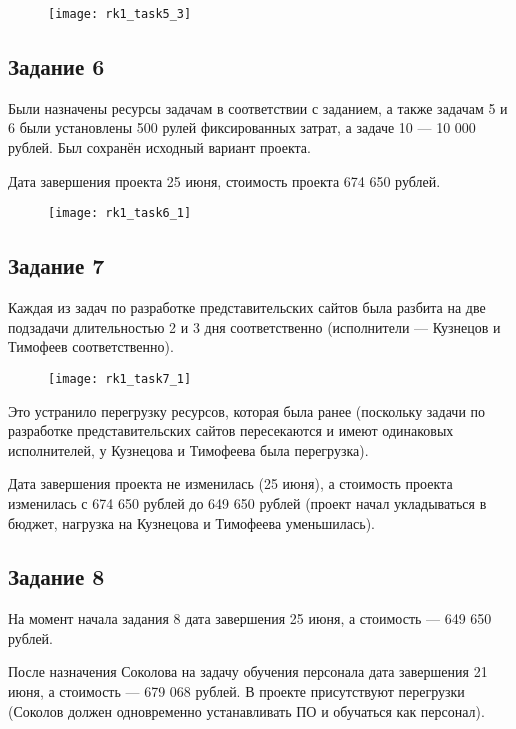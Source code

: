 \begin{figure}[h!]
	\texttt{[image: rk1\_task5\_3]}
\end{figure}

\subsection*{Задание 6}

Были назначены ресурсы задачам в соответствии с заданием, а также задачам 5 и 6 были установлены 500 рулей фиксированных затрат, а задаче 10 --- 10 000 рублей. Был сохранён исходный вариант проекта.

Дата завершения проекта 25 июня, стоимость проекта 674 650 рублей.

\begin{figure}[h!]
	\texttt{[image: rk1\_task6\_1]}
\end{figure}

\clearpage

\subsection*{Задание 7}

Каждая из задач по разработке представительских сайтов была разбита на две подзадачи длительностью 2 и 3 дня соответственно (исполнители --- Кузнецов и Тимофеев соответственно).

\begin{figure}[h!]
	\texttt{[image: rk1\_task7\_1]}
\end{figure}

Это устранило перегрузку ресурсов, которая была ранее (поскольку задачи по разработке представительских сайтов пересекаются и имеют одинаковых исполнителей, у Кузнецова и Тимофеева была перегрузка).

Дата завершения проекта не изменилась (25 июня), а стоимость проекта изменилась с 674 650 рублей до 649 650 рублей (проект начал укладываться в бюджет, нагрузка на Кузнецова и Тимофеева уменьшилась).

\subsection*{Задание 8}

На момент начала задания 8 дата завершения 25 июня, а стоимость --- 649 650 рублей.

После назначения Соколова на задачу обучения персонала дата завершения 21 июня, а стоимость --- 679 068 рублей. В проекте присутствуют перегрузки (Соколов должен одновременно устанавливать ПО и обучаться как персонал).

